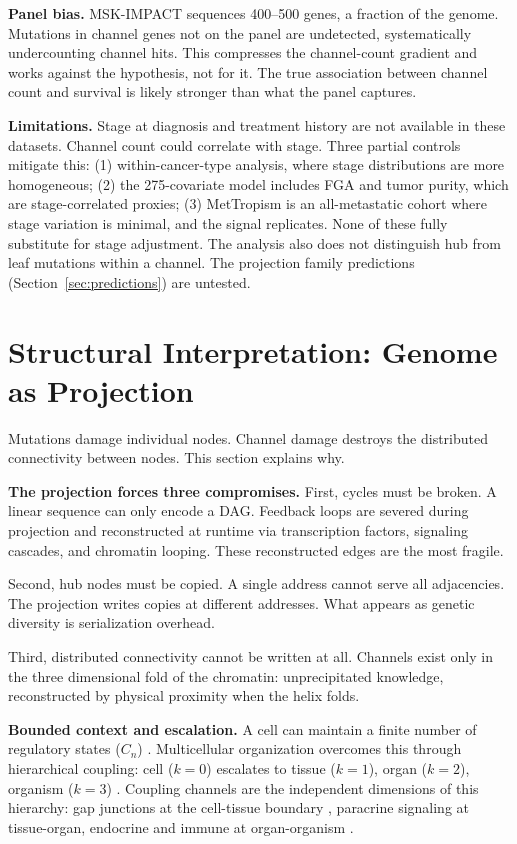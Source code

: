 \documentclass[11pt]{article}
\begin{document}
\textbf{Panel bias.} MSK-IMPACT sequences 400--500 genes, a
fraction of the genome. Mutations in channel genes not on the panel
are undetected, systematically undercounting channel hits. This
compresses the channel-count gradient and works against the
hypothesis, not for it. The true association between channel count
and survival is likely stronger than what the panel captures.

\textbf{Limitations.} Stage at diagnosis and treatment history are
not available in these datasets. Channel count could correlate with
stage. Three partial controls mitigate this: (1) within-cancer-type
analysis, where stage distributions are more homogeneous;
(2) the 275-covariate model includes FGA and tumor purity, which
are stage-correlated proxies; (3) MetTropism is an all-metastatic
cohort where stage variation is minimal, and the signal replicates.
None of these fully substitute for stage adjustment. The analysis
also does not distinguish hub from leaf mutations within a channel.
The projection family predictions (Section~\ref{sec:predictions})
are untested.

\section{Structural Interpretation: Genome as Projection}
\label{sec:framework}

Mutations damage individual nodes. Channel damage destroys the
distributed connectivity between nodes. This section explains why.

\textbf{The projection forces three compromises.}
First, cycles must be broken. A linear sequence can only encode a
DAG. Feedback loops are severed during projection and reconstructed
at runtime via transcription factors, signaling cascades, and
chromatin looping. These reconstructed edges are the most fragile.

Second, hub nodes must be copied. A single address cannot serve all
adjacencies. The projection writes copies at different addresses.
What appears as genetic diversity is serialization overhead.

Third, distributed connectivity cannot be written at all. Channels
exist only in the three dimensional fold of the chromatin:
unprecipitated knowledge, reconstructed by physical proximity when
the helix folds.

\textbf{Bounded context and escalation.}
A cell can maintain a finite number of regulatory states ($C_n$)
\cite{Cowan2001}. Multicellular organization overcomes this through
hierarchical coupling: cell ($k\!=\!0$) escalates to tissue
($k\!=\!1$), organ ($k\!=\!2$), organism ($k\!=\!3$)
\cite{McCarthy2026_BCA}. Coupling channels are the independent
dimensions of this hierarchy: gap junctions at the cell-tissue
boundary \cite{Aasen2016}, paracrine signaling at tissue-organ,
endocrine and immune at organ-organism \cite{Hanahan2011}.
\end{document}
